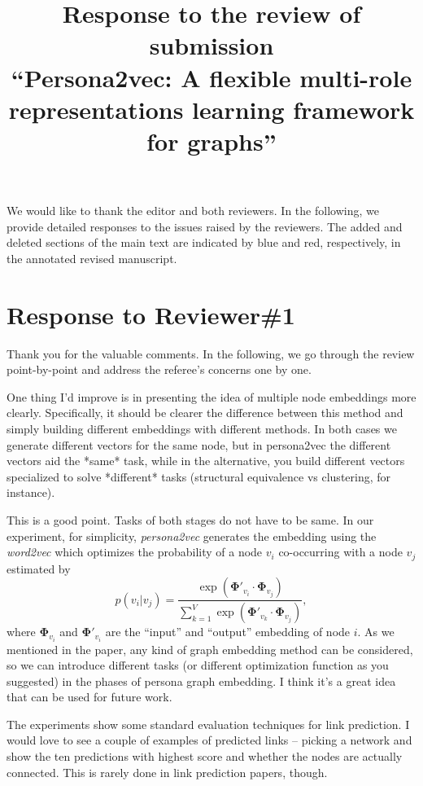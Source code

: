 \documentclass[12pt,a4paper]{article}
\title{Response to the review of submission\\  ``Persona2vec: A flexible multi-role representations learning framework for graphs''}
\date{}
\makeatletter
\newcommand{\response}[1]{{\leavevmode\noindent #1}}
\newcommand{\rcomment}[1]{%
\vspace{10pt}
\begin{tcolorbox}[colback=black!3,colframe=white!45!black]
#1
\end{tcolorbox}
}
\renewcommand{\maketitle}{\bgroup\setlength{\parindent}{0pt}
\begin{flushleft}
\Large  \textbf{\@title}
\end{flushleft}\egroup
}
\makeatother
\begin{document}
\maketitle

We would like to thank the editor and both reviewers.
In the following, we provide detailed responses to the issues raised by the reviewers.
The added and deleted sections of the main text are indicated by blue and red, respectively, in the annotated revised manuscript. 


\section*{Response to Reviewer\#1}

\response{%
Thank you for the valuable comments. 
In the following, we go through the review point-by-point and address the referee's concerns one by one.
}

\rcomment{%
One thing I'd improve is in presenting the idea of multiple node embeddings more clearly. Specifically, it should be clearer the difference between this method and simply building different embeddings with different methods. In both cases we generate different vectors for the same node, but in persona2vec the different vectors aid the *same* task, while in the alternative, you build different vectors specialized to solve *different* tasks (structural equivalence vs clustering, for instance).
}

\response{%
This is a good point. Tasks of both stages do not have to be same. In our experiment, for simplicity, \textit{persona2vec} generates the embedding using the \textit{word2vec} which optimizes the probability of a node $v_i$ co-occurring with a node $v_j$ estimated by
\begin{equation}
\label{eq:word2vec}
p(v_{i} \vert v_{j}) = \frac{\exp(\bm{\Phi'}_{v_i} \cdot \bm{\Phi}_{v_{j}})}{\sum_{k=1}^V \exp(\bm{\Phi'}_{v_k} \cdot \bm{\Phi}_{v_{j}})},
\end{equation}
 where $\bm{\Phi}_{v_i}$ and $\bm{\Phi'}_{v_i}$ are the ``input'' and ``output'' embedding of node $i$. As we mentioned in the paper, any kind of graph embedding method can be considered, so we can introduce different tasks (or different optimization function as you suggested) in the phases of persona graph embedding.
I think it's a great idea that can be used for future work.

}

\rcomment{%
The experiments show some standard evaluation techniques for link prediction. I would love to see a couple of examples of predicted links -- picking a network and show the ten predictions with highest score and whether the nodes are actually connected. This is rarely done in link prediction papers, though.
}
\end{document}
